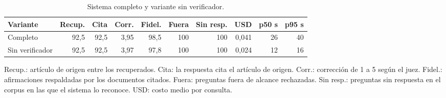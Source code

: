 \begin{table}[htbp]
\centering
\small
\caption{Sistema completo y variante sin verificador.}
\label{tab:sistema}
\begin{tabular}{lrrrrrrrrr}
\toprule
\textbf{Variante} & \textbf{Recup.} & \textbf{Cita} & \textbf{Corr.} & \textbf{Fidel.} & \textbf{Fuera} & \textbf{Sin resp.} & \textbf{USD} & \textbf{p50 s} & \textbf{p95 s} \\
\midrule
Completo & 92,5 & 92,5 & 3,95 & 98,5 & 100 & 100 & 0,041 & 26 & 40 \\
Sin verificador & 92,5 & 92,5 & 3,97 & 97,8 & 100 & 100 & 0,024 & 12 & 16 \\
\bottomrule
\end{tabular}
\par\smallskip\parbox{0.92\linewidth}{\footnotesize Recup.: artículo de origen entre los recuperados. Cita: la respuesta cita el artículo de origen. Corr.: corrección de 1 a 5 según el juez. Fidel.: afirmaciones respaldadas por los documentos citados. Fuera: preguntas fuera de alcance rechazadas. Sin resp.: preguntas sin respuesta en el corpus en las que el sistema lo reconoce. USD: costo medio por consulta.}
\end{table}
